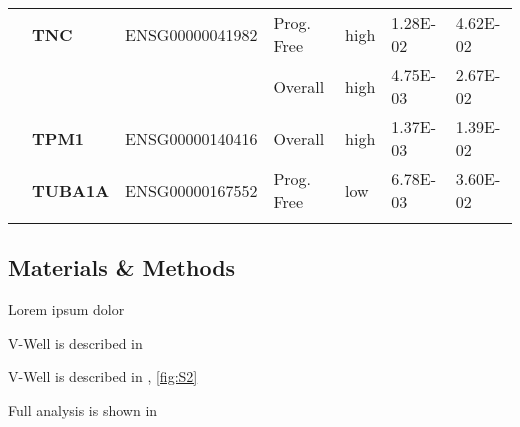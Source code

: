 {\begin{longtable}{|>{\bfseries}p{3cm}|>{\bfseries}p{1.9cm}|p{3cm}|p{2cm}|p{2cm}|p{1.5cm}|p{1.5cm}|}
        \hhline{~------}
                                                                & TNC      & ENSG00000041982 & Prog. Free & high & 1.28E-02 & 4.62E-02 \\
        \hhline{~~~----}
                                                                &          &                 & Overall    & high & 4.75E-03 & 2.67E-02 \\
        \hhline{~------}
                                                                & TPM1     & ENSG00000140416 & Overall    & high & 1.37E-03 & 1.39E-02 \\
        \hhline{~------}
                                                                & TUBA1A   & ENSG00000167552 & Prog. Free & low  & 6.78E-03 & 3.60E-02 \\
        \hhline{~------}






        \hline
    \end{longtable}
}


\newpage



\subsection{Materials \& Methods}
\label{subapdx:materialsmethods}
Lorem ipsum dolor

\newpage




V-Well is described in 

V-Well is described in , \ref{fig:S2}


Full analysis is shown in 


